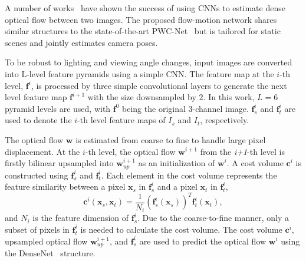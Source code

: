 \documentclass[letterpaper, 10 pt, conference]{ieeeconf}  %
\begin{document}
A number of works~\cite{flownet, flownet2, spy_net, pwc_net} have shown the success of using CNNs to estimate dense optical flow between two images. The proposed flow-motion network shares similar structures to the state-of-the-art PWC-Net~\cite{pwc_net} but is tailored for static scenes and jointly estimates camera poses. 
 
To be robust to lighting and viewing angle changes, input images are converted into L-level feature pyramids using a simple CNN. The feature map at the $i$-th level, $\mathbf{f}^i$, is processed by three simple convolutional layers to generate the next level feature map $\mathbf{f}^{i+1}$ with the size downsampled by $2$. In this work, $L=6$ pyramid levels are used, with $\mathbf{f}^0$ being the original 3-channel image. $\mathbf{f}_s^{i}$ and $\mathbf{f}_t^{i}$ are used to denote the  $i$-th level feature maps of $I_s$ and $I_t$, respectively. 
 
The optical flow $\mathbf{w}$ is estimated from coarse to fine to handle large pixel displacement. At the $i$-th level, the optical flow $\mathbf{w}^{i+1}$ from the \textit{i+1}-th level is firstly bilinear upsampled into $\mathbf{w}^{i+1}_{up}$ as an initialization of $\mathbf{w}^i$. A cost volume $\mathbf{c}^{i}$ is constructed using $\mathbf{f}_s^{i}$ and $\mathbf{f}_t^{i}$. Each element in the cost volume represents the feature similarity between a pixel $\mathbf{x}_s$ in $\mathbf{f}_s^{i}$ and a pixel $\mathbf{x}_t$ in $\mathbf{f}_t^{i}$,
\begin{equation}
\mathbf{c}^{i}(\mathbf{x}_s, \mathbf{x}_t) = \frac{1}{N_i} {(\mathbf{f}_s^{i}(\mathbf{x}_s))}^{T} \mathbf{f}_t^{i}(\mathbf{x}_t),
\end{equation}
and $N_i$ is the feature dimension of $\mathbf{f}_s^{i}$. Due to the coarse-to-fine manner, only a subset of pixels in $\mathbf{f}_t^{i}$ is needed to calculate the cost volume. The cost volume $\mathbf{c}^{i}$, upsampled optical flow $\mathbf{w}^{i+1}_{up}$, and $\mathbf{f}_s^{i}$ are used to predict the optical flow $\mathbf{w}^{i}$ using the DenseNet~\cite{dense_net} structure.
\end{document}
